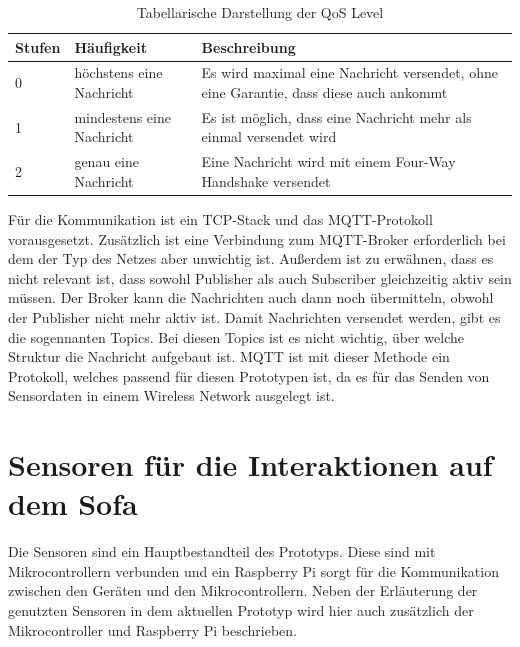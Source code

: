 \begin{table}[H]
	\centering
	\caption[Tabellarische Darstellung der QoS Level]{Tabellarische Darstellung der QoS Level \citep{soni2017survey}}
		\vspace{1.0em}	
	\begin{tabular}{| l | l | p{5cm}|}
		\hline
		\rowcolor[gray]{0.9}\textbf{Stufen} & \textbf{Häufigkeit} & \textbf{Beschreibung} \\
		\hline
		\hline
		0 & höchstens eine Nachricht & Es wird maximal eine Nachricht versendet, ohne eine Garantie, dass diese auch ankommt \\
		\hline
		1 & mindestens eine Nachricht & Es ist möglich, dass eine Nachricht mehr als einmal versendet wird \\
		\hline
		2 & genau eine Nachricht & Eine Nachricht wird mit einem Four-Way Handshake versendet \\
		\hline
	\end{tabular}
	\label{tab:tableqos}
\end{table}
\newline
Für die Kommunikation ist ein TCP-Stack und das MQTT-Protokoll vorausgesetzt. Zusätzlich ist eine Verbindung zum MQTT-Broker erforderlich bei dem der Typ des Netzes aber unwichtig ist. Außerdem ist zu erwähnen, dass es nicht relevant ist, dass sowohl Publisher als auch Subscriber gleichzeitig aktiv sein müssen. Der Broker kann die Nachrichten auch dann noch übermitteln, obwohl der Publisher nicht mehr aktiv ist.
\newline
Damit Nachrichten versendet werden, gibt es die sogennanten Topics. Bei diesen Topics ist es nicht wichtig, über welche Struktur die Nachricht aufgebaut ist. \citep{Trojan2017} MQTT ist mit dieser Methode ein Protokoll, welches passend für diesen Prototypen ist, da es für das Senden von Sensordaten in einem Wireless Network ausgelegt ist. 

\section{Sensoren für die Interaktionen auf dem Sofa}
Die Sensoren sind ein Hauptbestandteil des Prototyps. Diese sind mit Mikrocontrollern verbunden und ein Raspberry Pi sorgt für die Kommunikation zwischen den Geräten und den Mikrocontrollern. Neben der Erläuterung der genutzten Sensoren in dem aktuellen Prototyp wird hier auch zusätzlich der Mikrocontroller und Raspberry Pi beschrieben.

